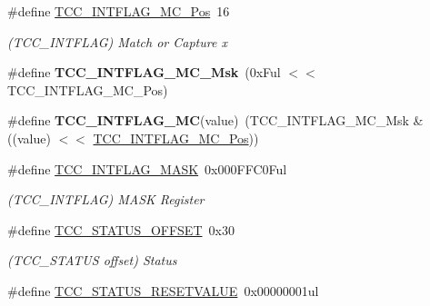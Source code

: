 \begin{DoxyCompactItemize}
\item 
\hypertarget{group___s_a_m_l21___t_c_c_ga67730d67f43bede88ea7a2208e470556}{}\#define \hyperlink{group___s_a_m_l21___t_c_c_ga67730d67f43bede88ea7a2208e470556}{T\+C\+C\+\_\+\+I\+N\+T\+F\+L\+A\+G\+\_\+\+M\+C\+\_\+\+Pos}~16\label{group___s_a_m_l21___t_c_c_ga67730d67f43bede88ea7a2208e470556}

\begin{DoxyCompactList}\small\item\em (T\+C\+C\+\_\+\+I\+N\+T\+F\+L\+A\+G) Match or Capture x \end{DoxyCompactList}\item 
\hypertarget{group___s_a_m_l21___t_c_c_ga28897e152ba61fd7641c015e7b3c3659}{}\#define {\bfseries T\+C\+C\+\_\+\+I\+N\+T\+F\+L\+A\+G\+\_\+\+M\+C\+\_\+\+Msk}~(0x\+Ful $<$$<$ T\+C\+C\+\_\+\+I\+N\+T\+F\+L\+A\+G\+\_\+\+M\+C\+\_\+\+Pos)\label{group___s_a_m_l21___t_c_c_ga28897e152ba61fd7641c015e7b3c3659}

\item 
\hypertarget{group___s_a_m_l21___t_c_c_gaa610e9aac12b2c139a3ad21d2e5cb26a}{}\#define {\bfseries T\+C\+C\+\_\+\+I\+N\+T\+F\+L\+A\+G\+\_\+\+M\+C}(value)~(T\+C\+C\+\_\+\+I\+N\+T\+F\+L\+A\+G\+\_\+\+M\+C\+\_\+\+Msk \& ((value) $<$$<$ \hyperlink{group___s_a_m_l21___t_c_c_ga67730d67f43bede88ea7a2208e470556}{T\+C\+C\+\_\+\+I\+N\+T\+F\+L\+A\+G\+\_\+\+M\+C\+\_\+\+Pos}))\label{group___s_a_m_l21___t_c_c_gaa610e9aac12b2c139a3ad21d2e5cb26a}

\item 
\hypertarget{group___s_a_m_l21___t_c_c_ga0f8cf74e1a4788ece420b4679f04d783}{}\#define \hyperlink{group___s_a_m_l21___t_c_c_ga0f8cf74e1a4788ece420b4679f04d783}{T\+C\+C\+\_\+\+I\+N\+T\+F\+L\+A\+G\+\_\+\+M\+A\+S\+K}~0x000\+F\+F\+C0\+Ful\label{group___s_a_m_l21___t_c_c_ga0f8cf74e1a4788ece420b4679f04d783}

\begin{DoxyCompactList}\small\item\em (T\+C\+C\+\_\+\+I\+N\+T\+F\+L\+A\+G) M\+A\+S\+K Register \end{DoxyCompactList}\item 
\hypertarget{group___s_a_m_l21___t_c_c_gac34952ceaaeece438d1cae38eadb11be}{}\#define \hyperlink{group___s_a_m_l21___t_c_c_gac34952ceaaeece438d1cae38eadb11be}{T\+C\+C\+\_\+\+S\+T\+A\+T\+U\+S\+\_\+\+O\+F\+F\+S\+E\+T}~0x30\label{group___s_a_m_l21___t_c_c_gac34952ceaaeece438d1cae38eadb11be}

\begin{DoxyCompactList}\small\item\em (T\+C\+C\+\_\+\+S\+T\+A\+T\+U\+S offset) Status \end{DoxyCompactList}\item 
\hypertarget{group___s_a_m_l21___t_c_c_ga4d5bf54412bb8def737fb6bd2af0ceb6}{}\#define \hyperlink{group___s_a_m_l21___t_c_c_ga4d5bf54412bb8def737fb6bd2af0ceb6}{T\+C\+C\+\_\+\+S\+T\+A\+T\+U\+S\+\_\+\+R\+E\+S\+E\+T\+V\+A\+L\+U\+E}~0x00000001ul\label{group___s_a_m_l21___t_c_c_ga4d5bf54412bb8def737fb6bd2af0ceb6}


\end{DoxyCompactItemize}

